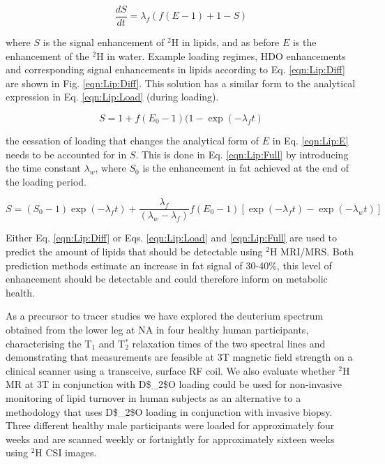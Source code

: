 \begin{equation}
    \frac{dS}{dt} = \lambda_f(f(E-1)+1-S)
    \label{eqn:Lip:Diff}
\end{equation}

\noindent where $S$ is the signal enhancement of $^2$H in lipids, and as before $E$ is the enhancement of the $^2$H in water. Example loading regimes, \ac{HDO} enhancements and corresponding signal enhancements in lipids according to Eq. \ref{eqn:Lip:Diff} are shown in Fig. \ref{eqn:Lip:Diff}. This solution has a similar form to the analytical expression in Eq. \ref{eqn:Lip:Load} (during loading).

\begin{equation}
    S = 1 + f(E_0 - 1)(1 - \exp(-\lambda_ft)
    \label{eqn:Lip:Load}
\end{equation}

 the cessation of loading that changes the analytical form of $E$ in Eq. \ref{eqn:Lip:E} needs to be accounted for in $S$. This is done in Eq. \ref{eqn:Lip:Full} by introducing the time constant $\lambda_w$, where $S_0$ is the enhancement in fat achieved at the end of the loading period.

\begin{equation}
    S = (S_0 - 1)\exp(-\lambda_ft)+\frac{\lambda_f}{(\lambda_w - \lambda_f)}f(E_0 - 1)[\exp(-\lambda_ft)-\exp(-\lambda_wt)]
    \label{eqn:Lip:Full}
\end{equation}

 Either Eq. \ref{eqn:Lip:Diff} or Eqs. \ref{eqn:Lip:Load} and \ref{eqn:Lip:Full} are used to predict the amount of lipids that should be detectable using $^2$H \ac{MRI}/\ac{MRS}. Both prediction methods estimate an increase in fat signal of 30-40\%, this level of enhancement should be detectable and could therefore inform on metabolic health. 
 
 As a precursor to tracer studies we have explored the deuterium spectrum obtained from the lower leg at \ac{NA} in four healthy human participants, characterising the T$_1$ and T$_2^*$ relaxation times of the two spectral lines and demonstrating that measurements are feasible at 3T magnetic field strength on a clinical scanner using a transceive, surface \ac{RF} coil. We also evaluate whether $^2$H MR at 3T in conjunction with \ac{D$_2$O} loading could be used for non-invasive monitoring of lipid turnover in human subjects as an alternative to a methodology that uses \ac{D$_2$O} loading in conjunction with invasive biopsy. Three different healthy male participants were loaded for approximately four weeks and are scanned weekly or fortnightly for approximately sixteen weeks using $^2$H \ac{CSI} images.


